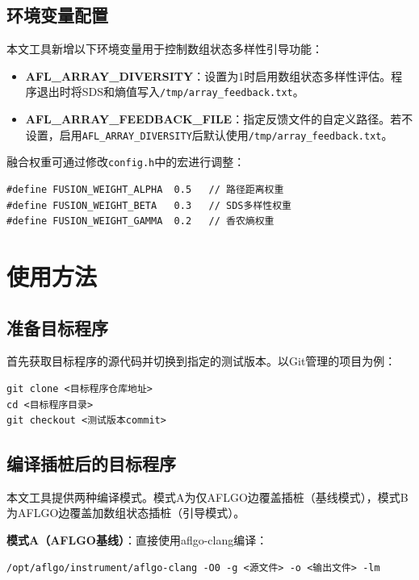 \documentclass[bachelor]{njupthesis}
\begin{document}
\subsection{环境变量配置}

本文工具新增以下环境变量用于控制数组状态多样性引导功能：

\begin{itemize}
\item \textbf{AFL\_ARRAY\_DIVERSITY}：设置为1时启用数组状态多样性评估。程序退出时将SDS和熵值写入\texttt{/tmp/array\_feedback.txt}。
\item \textbf{AFL\_ARRAY\_FEEDBACK\_FILE}：指定反馈文件的自定义路径。若不设置，启用\texttt{AFL\_ARRAY\_DIVERSITY}后默认使用\texttt{/tmp/array\_feedback.txt}。
\end{itemize}

融合权重可通过修改\texttt{config.h}中的宏进行调整：

\begin{verbatim}
#define FUSION_WEIGHT_ALPHA  0.5   // 路径距离权重
#define FUSION_WEIGHT_BETA   0.3   // SDS多样性权重
#define FUSION_WEIGHT_GAMMA  0.2   // 香农熵权重
\end{verbatim}

\section{使用方法}

\subsection{准备目标程序}

首先获取目标程序的源代码并切换到指定的测试版本。以Git管理的项目为例：

\begin{verbatim}
git clone <目标程序仓库地址>
cd <目标程序目录>
git checkout <测试版本commit>
\end{verbatim}

\subsection{编译插桩后的目标程序}

本文工具提供两种编译模式。模式A为仅AFLGO边覆盖插桩（基线模式），模式B为AFLGO边覆盖加数组状态插桩（引导模式）。

\textbf{模式A（AFLGO基线）}：直接使用aflgo-clang编译：

\begin{verbatim}
/opt/aflgo/instrument/aflgo-clang -O0 -g <源文件> -o <输出文件> -lm
\end{verbatim}
\end{document}
